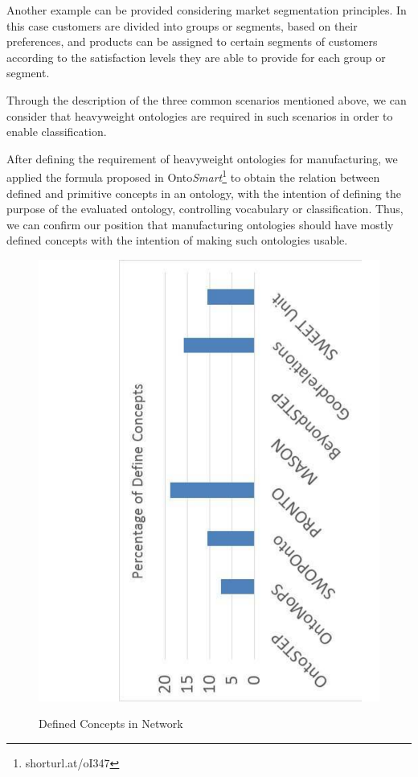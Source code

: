 Another example can be provided considering market segmentation principles. In this case customers are divided into groups or segments, based on their preferences, and products can be assigned to certain segments of customers according to the satisfaction levels they are able to provide for each group or segment. 

Through the description of the three common scenarios mentioned above, we can consider that heavyweight ontologies are required in such scenarios in order to enable classification. 

After defining the requirement of heavyweight ontologies for manufacturing, we applied the formula proposed in Onto\textit{Smart}\footnote{shorturl.at/oI347} to obtain the relation between defined and primitive concepts in an ontology, with the intention of defining the purpose of the evaluated ontology, controlling vocabulary or classification.  Thus, we can confirm our position that manufacturing ontologies should have mostly defined concepts with the intention of making such ontologies usable.   



\begin{figure}
\begin{center}
	\vspace{-20mm}
	\includegraphics[scale=0.5, angle=-90]{figure-chapterIV/fig4-29.pdf}\\
	\caption{Defined    Concepts in Network}
	\label{figure4-29}
\end{center}
\end{figure}



